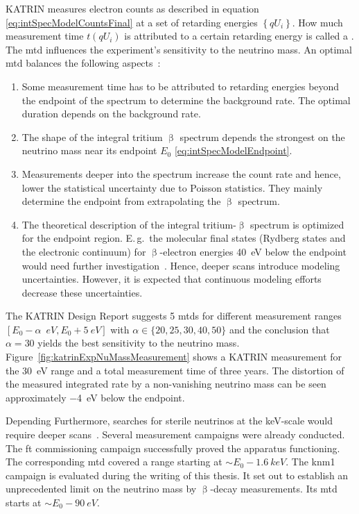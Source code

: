 KATRIN measures electron counts as described in equation \eqref{eq:intSpecModelCountsFinal} at a set of retarding energies $\left\{qU_i\right\}$. How much measurement time $t(qU_i)$ is attributed to a certain retarding energy is called a . The \gls{mtd} influences the experiment's sensitivity to the neutrino mass. An optimal \gls{mtd} balances the following aspects~\cite{Angrik:2005ep}:
\begin{enumerate}
	\item Some measurement time has to be attributed to retarding energies beyond the endpoint of the spectrum to determine the background rate. The optimal duration depends on the background rate.
	\item The shape of the integral tritium $\upbeta$ spectrum depends the strongest on the neutrino mass near its endpoint $E_0$ \eqref{eq:intSpecModelEndpoint}.
	\item Measurements deeper into the spectrum increase the count rate and hence, lower the statistical uncertainty due to Poisson statistics. They mainly determine the endpoint from extrapolating the $\upbeta$ spectrum.
	\item The theoretical description of the integral tritium-$\upbeta$ spectrum is optimized for the endpoint region. E.\,g.~the molecular final states (Rydberg states and the electronic continuum) for $\upbeta$-electron energies \SI{40}{eV} below the endpoint would need further investigation~\cite{Doss:2006}. Hence, deeper scans introduce modeling uncertainties. However, it is expected that continuous modeling efforts decrease these uncertainties.
\end{enumerate}
The KATRIN Design Report \cite{Angrik:2005ep} suggests 5 \gls{mtd}s for different measurement ranges $[E_0-\alpha\;\SI{}{eV}, E_0 + \SI{5}{eV}]$ with $\alpha \in \{20, 25, 30, 40, 50\}$ and the conclusion that $\alpha=30$ yields the best sensitivity to the neutrino mass. Figure~\ref{fig:katrinExpNuMassMeasurement} shows a KATRIN measurement for the \SI{30}{eV} range and a total measurement time of three years. The distortion of the measured integrated rate by a non-vanishing neutrino mass can be seen approximately \SI{-4}{eV} below the endpoint.

Depending 
Furthermore, searches for sterile neutrinos at the keV-scale would require deeper scans~\cite{Kleesiek2014}. Several measurement campaigns were already conducted. The \gls{ft} commissioning campaign successfully proved the apparatus functioning. The corresponding \gls{mtd} covered a range starting at $\sim E_0-\SI{1.6}{keV}$. The \gls{knm1} campaign is evaluated during the writing of this thesis. It set out to establish an unprecedented limit on the neutrino mass by $\upbeta$-decay measurements. Its \gls{mtd} starts at $\sim E_0-\SI{90}{eV}$.